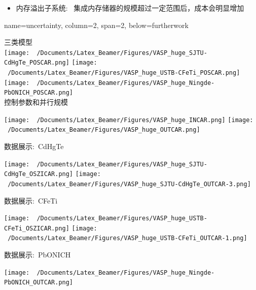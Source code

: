 \documentclass[a0paper,portrait,fontscale=0.35]{baposter}
\newcommand{\hei}{\CJKfamily{hei}}                          %
\begin{document}
\begin{poster}
{\begin{itemize}
\begin{itemize}
				\item 数据处理分层化:~将部分计算任务的处理过程进行分层，在负载均担与实时性需求之间进行再平衡
				\item 计算去中心化:~去掉各种形式的``主结点''，部分算法进行``去中心化''重写
			\end{itemize}
		\item 内存溢出子系统:~%
			集成内存储器的规模超过一定范围后，成本会明显增加\\
			{\fontsize{9.2pt}{7.2pt}}
	\end{itemize}
  }

  \headerbox{\hei 算例展示}
  {name=uncertainty, column=2, span=2, below=furtherwork}
  {
	 {\hei 三类模型}\\[-2.2em]
\texttt{[image: ~/Documents/Latex\_Beamer/Figures/VASP\_huge\_SJTU-CdHgTe\_POSCAR.png]}
\texttt{[image: ~/Documents/Latex\_Beamer/Figures/VASP\_huge\_USTB-CFeTi\_POSCAR.png]}
\texttt{[image: ~/Documents/Latex\_Beamer/Figures/VASP\_huge\_Ningde-PbONICH\_POSCAR.png]}\\[0.3em]
{控制参数和并行规模}\\[-1.8em]
\begin{center}
\texttt{[image: ~/Documents/Latex\_Beamer/Figures/VASP\_huge\_INCAR.png]}\hspace{3.0em}
\texttt{[image: ~/Documents/Latex\_Beamer/Figures/VASP\_huge\_OUTCAR.png]}
\end{center}
\vspace{-1.0em}
{数据展示:~\textrm{CdHgTe}}\\[-1.8em]
\begin{center}
\texttt{[image: ~/Documents/Latex\_Beamer/Figures/VASP\_huge\_SJTU-CdHgTe\_OSZICAR.png]}
\texttt{[image: ~/Documents/Latex\_Beamer/Figures/VASP\_huge\_SJTU-CdHgTe\_OUTCAR-3.png]}\\
\end{center}
\vspace{-1.0em}
{数据展示:~\textrm{CFeTi}}\\[-1.8em]
\begin{center}
\texttt{[image: ~/Documents/Latex\_Beamer/Figures/VASP\_huge\_USTB-CFeTi\_OSZICAR.png]}
\texttt{[image: ~/Documents/Latex\_Beamer/Figures/VASP\_huge\_USTB-CFeTi\_OUTCAR-1.png]}\\
\end{center}
\vspace{-1.0em}
{数据展示:~\textrm{PbONICH}}\\[-2.4em]
\begin{center}
\texttt{[image: ~/Documents/Latex\_Beamer/Figures/VASP\_huge\_Ningde-PbONICH\_OUTCAR.png]}
\end{center}
  }



\end{poster}
\end{document}
